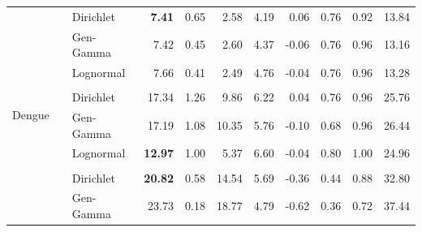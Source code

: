 \documentclass[12pt]{article}
\begin{document}
\begin{table}[!htb]
\begin{tabular}{r | >{\raggedleft\arraybackslash}p{0.55in} | >{\raggedleft\arraybackslash}p{0.85in} | r r r r r r r r}
\multirow{15}{*}{Dengue} & \multirow{3}{*}{HSGP}
& \cellcolor{delayC!25}Dirichlet & \cellcolor{delayC!25}\bf 7.41 & \cellcolor{delayC!25}0.65 & \cellcolor{delayC!25}2.58 & \cellcolor{delayC!25}4.19 & \cellcolor{delayC!25}0.06 & \cellcolor{delayC!25}0.76 & \cellcolor{delayC!25}0.92 & \cellcolor{delayC!25}13.84 \\
& & \cellcolor{delayB!25}Gen-Gamma & \cellcolor{delayB!25}7.42 & \cellcolor{delayB!25}0.45 & \cellcolor{delayB!25}2.60 & \cellcolor{delayB!25}4.37 & \cellcolor{delayB!25}-0.06 & \cellcolor{delayB!25}0.76 & \cellcolor{delayB!25}0.96 & \cellcolor{delayB!25}13.16 \\
& & \cellcolor{delayA!25}Lognormal & \cellcolor{delayA!25}7.66 & \cellcolor{delayA!25}0.41 & \cellcolor{delayA!25}2.49 & \cellcolor{delayA!25}4.76 & \cellcolor{delayA!25}-0.04 & \cellcolor{delayA!25}0.76 & \cellcolor{delayA!25}0.96 & \cellcolor{delayA!25}13.28 \\
\\
& \multirow{3}{*}{AR1}
& \cellcolor{delayC!25}Dirichlet & \cellcolor{delayC!25}17.34 & \cellcolor{delayC!25}1.26 & \cellcolor{delayC!25}9.86 & \cellcolor{delayC!25}6.22 & \cellcolor{delayC!25}0.04 & \cellcolor{delayC!25}0.76 & \cellcolor{delayC!25}0.96 & \cellcolor{delayC!25}25.76 \\
& & \cellcolor{delayB!25}Gen-Gamma & \cellcolor{delayB!25}17.19 & \cellcolor{delayB!25}1.08 & \cellcolor{delayB!25}10.35 & \cellcolor{delayB!25}5.76 & \cellcolor{delayB!25}-0.10 & \cellcolor{delayB!25}0.68 & \cellcolor{delayB!25}0.96 & \cellcolor{delayB!25}26.44 \\
& & \cellcolor{delayA!25}Lognormal & \cellcolor{delayA!25}\bf 12.97 & \cellcolor{delayA!25}1.00 & \cellcolor{delayA!25}5.37 & \cellcolor{delayA!25}6.60 & \cellcolor{delayA!25}-0.04 & \cellcolor{delayA!25}0.80 & \cellcolor{delayA!25}1.00 & \cellcolor{delayA!25}24.96 \\
\\
& \multirow{3}{*}{SIR}
& \cellcolor{delayC!25}Dirichlet & \cellcolor{delayC!25}\bf 20.82 & \cellcolor{delayC!25}0.58 & \cellcolor{delayC!25}14.54 & \cellcolor{delayC!25}5.69 & \cellcolor{delayC!25}-0.36 & \cellcolor{delayC!25}0.44 & \cellcolor{delayC!25}0.88 & \cellcolor{delayC!25}32.80 \\
& & \cellcolor{delayB!25}Gen-Gamma & \cellcolor{delayB!25}23.73 & \cellcolor{delayB!25}0.18 & \cellcolor{delayB!25}18.77 & \cellcolor{delayB!25}4.79 & \cellcolor{delayB!25}-0.62 & \cellcolor{delayB!25}0.36 & \cellcolor{delayB!25}0.72 & \cellcolor{delayB!25}37.44 \\

\end{tabular}
\end{table}
\end{document}
